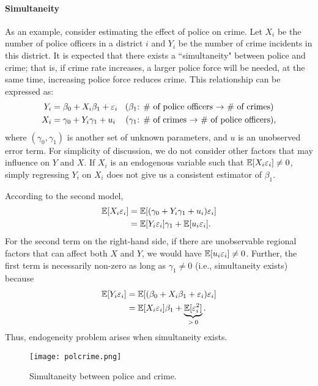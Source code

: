 \documentclass[11pt, A4paper, openany, uplatex]{book}
\begin{document}
\paragraph{Simultaneity}
As an example, consider estimating the effect of police on crime.
Let $X_i$ be the number of police officers in a district $i$ and $Y_i$ be the number of crime incidents in this district. 
It is expected that there exists a ``simultaneity" between police and crime; that is, if crime rate increases, a larger police force will be needed, at the same time, increasing police force reduces crime.
This relationship can be expressed as: 
\begin{align*}
Y_i  &  =\beta_0 + X_i \beta_1 + \varepsilon_i \;\; \text{ ($\beta_1$: \# of  police officers $\rightarrow$ \# of crimes)} \\
X_i  &  =\gamma_0 + Y_i\gamma_1 + u_i \;\;\; \text{ ($\gamma_1$: \# of crimes $\rightarrow$ \# of police officers)},
\end{align*}
where $(\gamma_0, \gamma_1)$ is another set of unknown parameters, and $u$ is an unobserved error term.
For simplicity of discussion, we do not consider other factors that may influence on $Y$ and $X$.
If $X_i$ is an endogenous variable such that $\mathbb{E}[  X_i \varepsilon_i ]  \neq 0$, simply regressing $Y_i$ on $X_i$ does not give us a consistent estimator of $\beta_1$.

According to the second model,
\begin{align*}
	\mathbb{E}[ X_i \varepsilon_i ] 
	& = \mathbb{E}[(\gamma_0 + Y_i \gamma_1 + u_i) \varepsilon_i ] \\
	& = \mathbb{E}[  Y_i \varepsilon_i ]  \gamma_1 + \mathbb{E}[u_i \varepsilon_i].
\end{align*}
For the second term on the right-hand side, if there are unobservable regional factors that can affect both $X$ and $Y$, we would have $\mathbb{E}[u_i \varepsilon_i] \neq 0$.
Further, the first term is necessarily non-zero as long as $\gamma_1 \neq 0$ (i.e., simultaneity exists) because
\begin{align*}
	\mathbb{E}[  Y_i \varepsilon_i ]
	& = \mathbb{E}[(\beta_0 + X_i \beta_1 + \varepsilon_i) \varepsilon_i ] \\
	& = \mathbb{E}[  X_i \varepsilon_i ]  \beta_1 + \underbrace{\mathbb{E}[\varepsilon^2_i]}_{ > \: 0}.
\end{align*}
Thus, endogeneity problem arises when simultaneity exists.

\begin{figure}[h!]
	\begin{center}
		\texttt{[image: polcrime.png]}
		\caption{Simultaneity between police and crime.}
	\end{center}
\end{figure}
\end{document}

